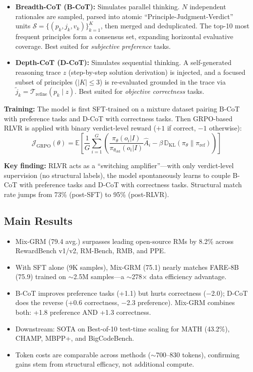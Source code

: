 \documentclass[11pt]{article}
\begin{document}
\begin{itemize}
    \item \textbf{Breadth-CoT (B-CoT):} Simulates parallel thinking. $N$ independent rationales are sampled, parsed into atomic ``Principle-Judgment-Verdict'' units $\mathcal{S} = \{(p_k, j_k, v_k)\}_{k=1}^{K}$, then merged and deduplicated. The top-10 most frequent principles form a consensus set, expanding horizontal evaluative coverage. Best suited for \emph{subjective preference} tasks.

    \item \textbf{Depth-CoT (D-CoT):} Simulates sequential thinking. A self-generated reasoning trace $z$ (step-by-step solution derivation) is injected, and a focused subset of principles ($|K| \leq 3$) is re-evaluated grounded in the trace via $\tilde{j}_k = \mathcal{T}_{\text{refine}}(p_k \mid z)$. Best suited for \emph{objective correctness} tasks.
\end{itemize}

\noindent\textbf{Training:} The model is first SFT-trained on a mixture dataset pairing B-CoT with preference tasks and D-CoT with correctness tasks. Then GRPO-based RLVR is applied with binary verdict-level reward ($+1$ if correct, $-1$ otherwise):
\begin{equation}
    \mathcal{J}_{\text{GRPO}}(\theta) = \mathbb{E}\left[\frac{1}{G}\sum_{i=1}^{G}\left(\frac{\pi_\theta(o_i|I)}{\pi_{\theta_{\text{old}}}(o_i|I)}\hat{A}_i - \beta\,\mathbb{D}_{\text{KL}}(\pi_\theta \| \pi_{\text{ref}})\right)\right]
\end{equation}

\noindent\textbf{Key finding:} RLVR acts as a ``switching amplifier''---with only verdict-level supervision (no structural labels), the model spontaneously learns to couple B-CoT with preference tasks and D-CoT with correctness tasks. Structural match rate jumps from 73\% (post-SFT) to 95\% (post-RLVR).

\subsection{Main Results}

\begin{itemize}
    \item Mix-GRM (79.4 avg.) surpasses leading open-source RMs by 8.2\% across RewardBench v1/v2, RM-Bench, RMB, and PPE.
    \item With SFT alone (9K samples), Mix-GRM (75.1) nearly matches FARE-8B (75.9) trained on $\sim$2.5M samples---a $\sim$278$\times$ data efficiency advantage.
    \item B-CoT improves preference tasks (+1.1) but hurts correctness ($-$2.0); D-CoT does the reverse (+0.6 correctness, $-$2.3 preference). Mix-GRM combines both: +1.8 preference AND +1.3 correctness.
    \item Downstream: SOTA on Best-of-10 test-time scaling for MATH (43.2\%), CHAMP, MBPP+, and BigCodeBench.
    \item Token costs are comparable across methods ($\sim$700--830 tokens), confirming gains stem from structural efficacy, not additional compute.
\end{itemize}
\end{document}
